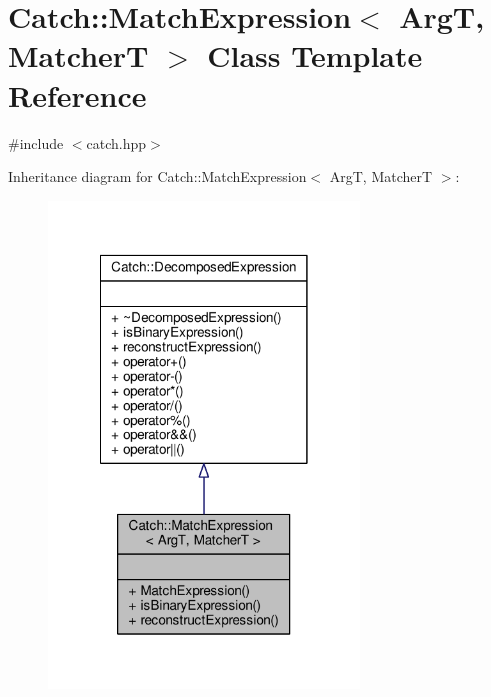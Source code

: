 \hypertarget{class_catch_1_1_match_expression}{\section{Catch\-:\-:Match\-Expression$<$ Arg\-T, Matcher\-T $>$ Class Template Reference}
\label{class_catch_1_1_match_expression}
}


{\ttfamily \#include $<$catch.\-hpp$>$}



Inheritance diagram for Catch\-:\-:Match\-Expression$<$ Arg\-T, Matcher\-T $>$\-:
\nopagebreak
\begin{figure}[H]
\begin{center}
\leavevmode
\includegraphics[width=234pt]{class_catch_1_1_match_expression__inherit__graph}
\end{center}
\end{figure}


